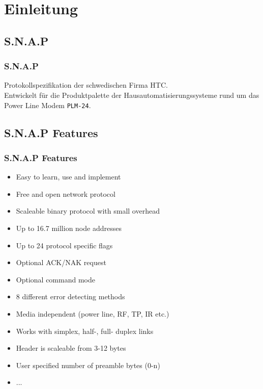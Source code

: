\section{Einleitung}

\subsection{S.N.A.P}
\begin{frame}
\frametitle{S.N.A.P}
Protokollspezifikation der schwedischen Firma HTC.\\
Entwickelt f\"ur die Produktpalette der Hausautomatisierungssysteme rund um das
Power Line Modem \texttt{PLM-24}.
\end{frame}

\subsection{S.N.A.P Features}
\begin{frame}
\frametitle{S.N.A.P Features}
\begin{itemize}
  \item Easy to learn, use and implement
  \item Free and open network protocol
  \item<alert@2> Scaleable binary protocol with small overhead
  \item Up to 16.7 million node addresses
  \item Up to 24 protocol specific flags 
  \item<alert@3> Optional ACK/NAK request
  \item Optional command mode
  \item<alert@4> 8 different error detecting methods
  \item Media independent (power line, RF, TP, IR etc.)
  \item Works with simplex, half-, full- duplex links
  \item<alert@5> Header is scaleable from 3-12 bytes
  \item User specified number of preamble bytes (0-n)
  \item ...
\end{itemize}
\end{frame}

